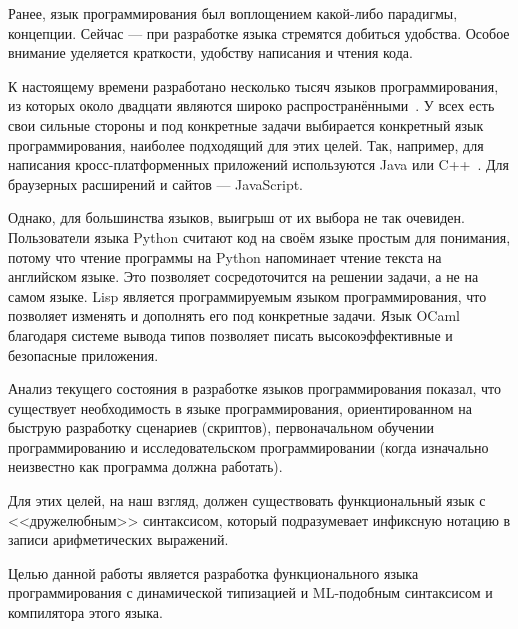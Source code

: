 \introductiontitle
    Ранее, язык программирования был воплощением какой-либо парадигмы, концепции.
    Сейчас --- при разработке языка стремятся добиться удобства.
    Особое внимание уделяется краткости, удобству написания и чтения кода.

    К настоящему времени разработано несколько тысяч языков программирования, из которых около двадцати являются широко распространёнными~\cite{TIOBE}.
    У всех есть свои сильные стороны и под конкретные задачи выбирается конкретный язык программирования, наиболее подходящий для этих целей.
    Так, например, для написания кросс-платформенных приложений используются Java или C++~\cite{p_c_lisp}.
    Для браузерных расширений и сайтов --- JavaScript.

    Однако, для большинства языков, выигрыш от их выбора не так очевиден.
    Пользователи языка Python считают код на своём языке простым для понимания, потому что чтение программы на Python напоминает чтение текста на английском языке.
    Это позволяет сосредоточится на решении задачи, а не на самом языке.
    Lisp является программируемым языком программирования, что позволяет изменять и дополнять его под конкретные задачи.
    Язык OCaml благодаря системе вывода типов позволяет писать высокоэффективные и безопасные приложения.

    Анализ текущего состояния в разработке языков программирования показал, что существует необходимость в языке программирования, ориентированном на быструю разработку сценариев (скриптов), первоначальном обучении программированию и исследовательском программировании (когда изначально неизвестно как программа должна работать).

    Для этих целей, на наш взгляд, должен существовать функциональный язык с <<дружелюбным>> синтаксисом, который подразумевает инфиксную нотацию в записи арифметических выражений.

    Целью данной работы является разработка функционального языка программирования с динамической типизацией и ML-подобным синтаксисом и компилятора этого языка.